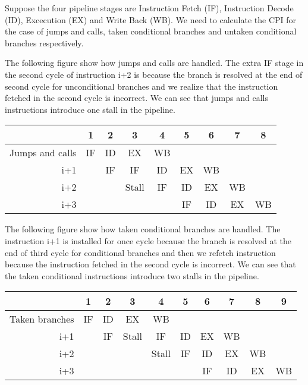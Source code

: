 \documentclass{article}
\begin{document}
Suppose the four pipeline stages are Instruction Fetch (IF), Instruction Decode (ID), Excecution (EX) and Write Back (WB). We need to calculate the CPI for the case of jumps and calls, taken conditional branches and untaken conditional branches respectively.

The following figure show how jumps and calls are handled. The extra IF stage in the second cycle of instruction i+2 is because the branch is resolved at the end of second cycle for unconditional branches and we realize that the instruction fetched in the second cycle is incorrect. We can see that jumps and calls instructions introduce one stall in the pipeline.

\begin{table}[ht!]
\begin{center}
\begin{tabular}{r|c|c|c|c|c|c|c|c} %
    \toprule
    &\textbf{1}&\textbf{2}&\textbf{3}&\textbf{4}&\textbf{5}&\textbf{6}&\textbf{7}&\textbf{8}\\
    \hline
    Jumps and calls&IF&ID&EX&WB&&&\\
    \hline
    i+1&&IF&IF&ID&EX&WB&\\
    \hline
    i+2&&&Stall&IF&ID&EX&WB&\\
    \hline
    i+3&&&&&IF&ID&EX&WB\\
    \bottomrule
    \end{tabular}
\end{center}
\end{table}

The following figure show how taken conditional branches are handled. The instruction i+1 is installed for once cycle because the branch is resolved at the end of third cycle for conditional branches and then we refetch instruction because the instruction fetched in the second cycle is incorrect. We can see that the taken conditional instructions introduce two stalls in the pipeline.

\begin{table}[ht!]
\begin{center}
\begin{tabular}{r|c|c|c|c|c|c|c|c|c} %
    \toprule
    &\textbf{1}&\textbf{2}&\textbf{3}&\textbf{4}&\textbf{5}&\textbf{6}&\textbf{7}&\textbf{8}&\textbf{9}\\
    \hline
    Taken branches&IF&ID&EX&WB&&&&\\
    \hline
    i+1&&IF&Stall&IF&ID&EX&WB&\\
    \hline
    i+2&&&&Stall&IF&ID&EX&WB\\
    \hline
    i+3&&&&&&IF&ID&EX&WB\\
    \bottomrule
    \end{tabular}
\end{center}
\end{table}
\end{document}
